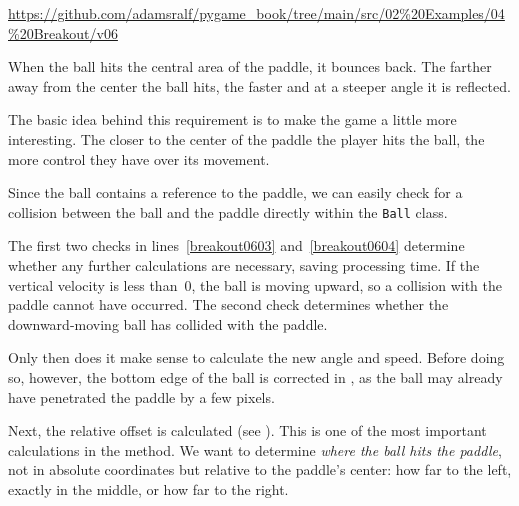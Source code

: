 \begin{diskbox}
	\url{https://github.com/adamsralf/pygame_book/tree/main/src/02%20Examples/04%20Breakout/v06}
\end{diskbox}

	When the ball hits the central area of the paddle, it bounces back. The farther away from the center the ball hits, the faster and at a steeper angle it is reflected.
\er

The basic idea behind this requirement is to make the game a little more interesting. The closer to the center of the paddle the player hits the ball, the more control they have over its movement.

Since the ball contains a reference to the paddle, we can easily check for a collision between the ball and the paddle directly within the \texttt{Ball} class.

The first two checks in lines~\ref{breakout0603} and~\ref{breakout0604} determine whether any further calculations are necessary, saving processing time. If the vertical velocity is less than~0, the ball is moving upward, so a collision with the paddle cannot have occurred. The second check determines whether the downward-moving ball has collided with the paddle.

Only then does it make sense to calculate the new angle and speed. Before doing so, however, the bottom edge of the ball is corrected in , as the ball may already have penetrated the paddle by a few pixels.

Next, the relative offset is calculated (see ). This is one of the most important calculations in the method. We want to determine \emph{where the ball hits the paddle}, not in absolute coordinates but relative to the paddle's center: how far to the left, exactly in the middle, or how far to the right.


